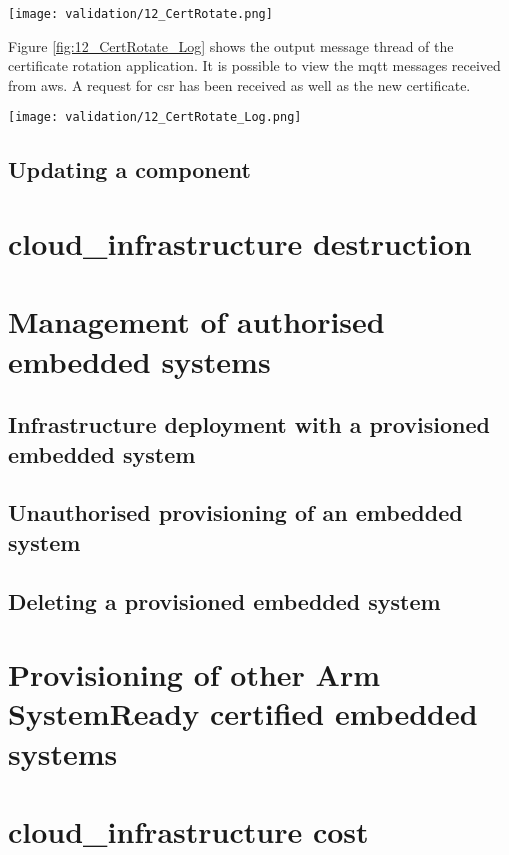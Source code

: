 \begin{center}
    \begingroup
    \texttt{[image: validation/12\_CertRotate.png]}
    \label{fig:12_CertRotate}
    \endgroup
\end{center}
Figure \ref{fig:12_CertRotate_Log} shows the output message thread of the certificate rotation application. It is possible to view the \acrshort{mqtt} messages received from \gls{aws}. A request for \acrshort{csr} has been received as well as the new certificate.
\begin{center}
    \begingroup
    \texttt{[image: validation/12\_CertRotate\_Log.png]}
    \label{fig:12_CertRotate_Log}
    \endgroup
\end{center}

\subsection{Updating a component}

\section{\texorpdfstring{\Gls{cloud_infrastructure}}{} destruction}


\section{Management of authorised embedded systems}

\subsection{Infrastructure deployment with a provisioned embedded system}

\subsection{Unauthorised provisioning of an embedded system}

\subsection{Deleting a provisioned embedded system}

\section{Provisioning of other Arm SystemReady certified embedded systems}


\section{\texorpdfstring{\Gls{cloud_infrastructure}}{} cost}


